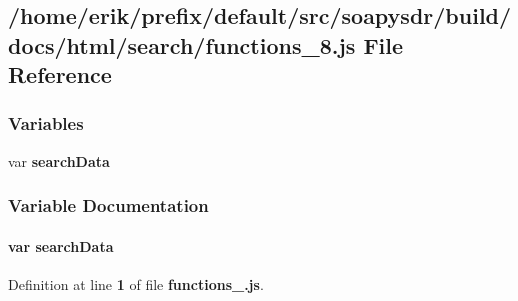 \subsection{/home/erik/prefix/default/src/soapysdr/build/docs/html/search/functions\+\_\+8.js File Reference}
\label{functions__8_8js}
\subsubsection*{Variables}
\begin{DoxyCompactItemize}
\item 
var {\bf search\+Data}
\end{DoxyCompactItemize}


\subsubsection{Variable Documentation}
\paragraph[{search\+Data}]{\setlength{\rightskip}{0pt plus 5cm}var search\+Data}\label{functions__8_8js_ad01a7523f103d6242ef9b0451861231e}


Definition at line {\bf 1} of file {\bf functions\+\_.\+js}.

